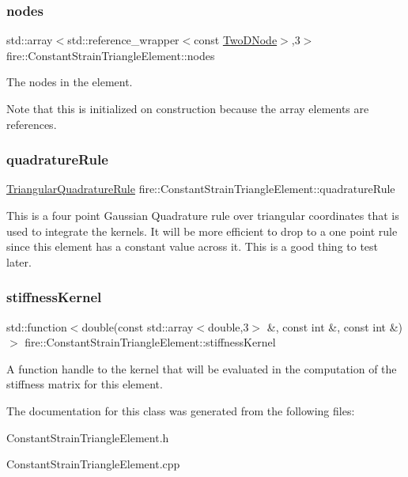 \subsubsection{\texorpdfstring{nodes}{nodes}}
{\footnotesize\ttfamily std\+::array$<$std\+::reference\+\_\+wrapper$<$const \hyperlink{a00189_a92dafcc05a788e1065a5792b67f0f70e}{Two\+D\+Node}$>$,3$>$ fire\+::\+Constant\+Strain\+Triangle\+Element\+::nodes\hspace{0.3cm}{\ttfamily [protected]}}

The nodes in the element.

Note that this is initialized on construction because the array elements are references. \mbox{\label{a00764_a344419454bc8f003713ef5b009c73a65}} 
\subsubsection{\texorpdfstring{quadrature\+Rule}{quadratureRule}}
{\footnotesize\ttfamily \hyperlink{a00852}{Triangular\+Quadrature\+Rule} fire\+::\+Constant\+Strain\+Triangle\+Element\+::quadrature\+Rule\hspace{0.3cm}{\ttfamily [protected]}}

This is a four point Gaussian Quadrature rule over triangular coordinates that is used to integrate the kernels. It will be more efficient to drop to a one point rule since this element has a constant value across it. This is a good thing to test later. \mbox{\label{a00764_ae2480b5335fe78245cb1006e3eeb034d}} 
\subsubsection{\texorpdfstring{stiffness\+Kernel}{stiffnessKernel}}
{\footnotesize\ttfamily std\+::function$<$double(const std\+::array$<$double,3$>$ \&, const int \&, const int \&)$>$ fire\+::\+Constant\+Strain\+Triangle\+Element\+::stiffness\+Kernel\hspace{0.3cm}{\ttfamily [protected]}}

A function handle to the kernel that will be evaluated in the computation of the stiffness matrix for this element. 

The documentation for this class was generated from the following files\+:\begin{DoxyCompactItemize}
\item 
Constant\+Strain\+Triangle\+Element.\+h\item 
Constant\+Strain\+Triangle\+Element.\+cpp\end{DoxyCompactItemize}
